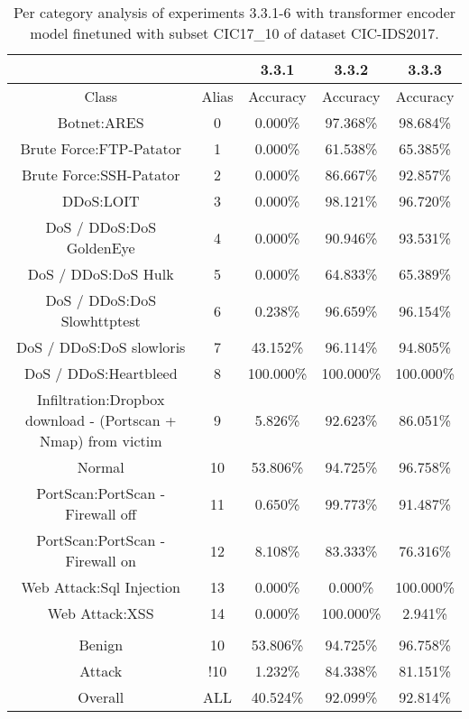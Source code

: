 \begin{table}[htb]
    \centering
    \begin{tabular}{@{}ccccc@{}}
        \toprule
         &  & 3.3.1 & 3.3.2 & 3.3.3 \\
        \midrule
        Class &  Alias &  Accuracy &  Accuracy &  Accuracy \\
        Botnet:ARES &  0 &  0.000\% &  97.368\% &  98.684\% \\
        Brute Force:FTP-Patator &  1 &  0.000\% &  61.538\% &  65.385\% \\
        Brute Force:SSH-Patator &  2 &  0.000\% &  86.667\% &  92.857\% \\
        DDoS:LOIT &  3 &  0.000\% &  98.121\% &  96.720\% \\
        DoS / DDoS:DoS GoldenEye &  4 &  0.000\% &  90.946\% &  93.531\% \\
        DoS / DDoS:DoS Hulk &  5 &  0.000\% &  64.833\% &  65.389\% \\
        DoS / DDoS:DoS Slowhttptest &  6 &  0.238\% &  96.659\% &  96.154\% \\
        DoS / DDoS:DoS slowloris &  7 &  43.152\% &  96.114\% &  94.805\% \\
        DoS / DDoS:Heartbleed &  8 &  100.000\% &  100.000\% &  100.000\% \\
        Infiltration:Dropbox download - (Portscan + Nmap) from victim &  9 &  5.826\% &  92.623\% &  86.051\% \\
        Normal &  10 &  53.806\% &  94.725\% &  96.758\% \\
        PortScan:PortScan - Firewall off &  11 &  0.650\% &  99.773\% &  91.487\% \\
        PortScan:PortScan - Firewall on &  12 &  8.108\% &  83.333\% &  76.316\% \\
        Web Attack:Sql Injection &  13 &  0.000\% &  0.000\% &  100.000\% \\
        Web Attack:XSS &  14 &  0.000\% &  100.000\% &  2.941\% \\
         \\
        Benign &  10 &  53.806\% &  94.725\% &  96.758\% \\
        Attack &  !10 &  1.232\% &  84.338\% &  81.151\% \\
        Overall &  ALL &  40.524\% &  92.099\% &  92.814\% \\
        \bottomrule
    \end{tabular}
    \caption{Per category analysis of experiments 3.3.1-6 with transformer encoder model finetuned with subset CIC17\_10 of dataset CIC-IDS2017.}
    \label{table:results:lstm:class_flows_subset}
\end{table}